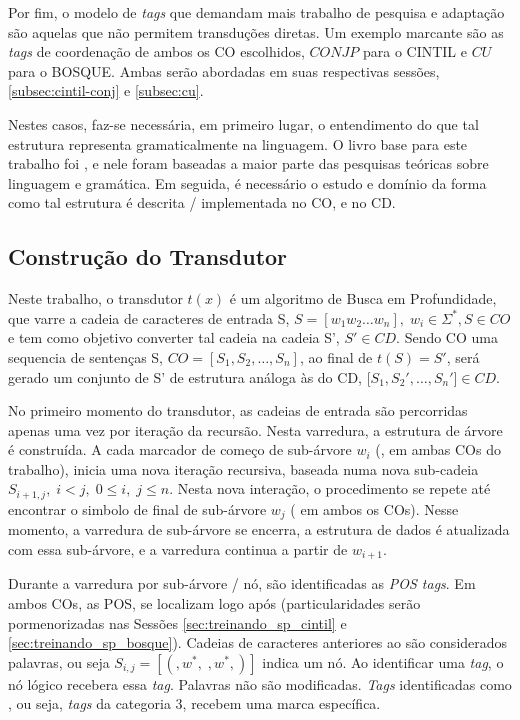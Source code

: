 Por fim, o modelo de \textit{tags} que demandam mais trabalho de pesquisa e adaptação são aquelas que não permitem transduções diretas. Um exemplo marcante são as \textit{tags} de coordenação de ambos os CO escolhidos, $CONJP$ para o CINTIL e $CU$ para o BOSQUE. Ambas serão abordadas em suas respectivas sessões, \ref{subsec:cintil-conj} e \ref{subsec:cu}.

Nestes casos, faz-se necessária, em primeiro lugar, o entendimento do que tal estrutura representa gramaticalmente na linguagem. O livro base para este trabalho foi \cite{Castilho2010gramatica}, e nele foram baseadas a maior parte das pesquisas teóricas sobre linguagem e gramática. Em seguida, é necessário o estudo e domínio da forma como tal estrutura é descrita / implementada no CO, e no CD.

\subsection{Construção do Transdutor}
\label{subsec:construcao_transdutor}
Neste trabalho, o transdutor $t(x)$ é um algoritmo de Busca em Profundidade, que varre a cadeia de caracteres de entrada S, $S = [w_1w_2\ldots w_n],\; w_i \in \Sigma^*,S \in CO$ e tem como objetivo converter tal cadeia na cadeia S', $S'\in CD$. Sendo CO uma sequencia de sentenças S, $CO=[S_1,S_2,\ldots,S_n]$, ao final de $t(S)=S'$, será gerado um conjunto de S' de estrutura análoga às do CD, [$S_1,S_2',\ldots,S_n']\in CD$. 

No primeiro momento do transdutor, as cadeias de entrada são percorridas apenas uma vez por iteração da recursão. Nesta varredura, a estrutura de árvore é construída. A cada marcador de começo de sub-árvore $w_i$ (, em ambas COs do trabalho), inicia uma nova iteração recursiva, baseada numa nova sub-cadeia $S_{i+1,j},\;i<j,\;0\leq i,\; j\leq n$. Nesta nova interação, o procedimento se repete até encontrar o simbolo de final de sub-árvore $w_j$ ( em ambos os COs). Nesse momento, a varredura de sub-árvore se encerra, a estrutura de dados é atualizada com essa sub-árvore, e a varredura continua a partir de $w_{i+1}$.

Durante a varredura por sub-árvore / nó, são identificadas as \textit{POS tags}. Em ambos COs, as POS, se localizam logo após \textquote{(} (particularidades serão pormenorizadas nas Sessões \ref{sec:treinando_sp_cintil} e \ref{sec:treinando_sp_bosque}). Cadeias de caracteres anteriores ao \textquote{)} são considerados palavras, ou seja $S_{i,j}=[(, w^*,\;,w^*,)]$ indica um nó. Ao identificar uma \textit{tag}, o nó lógico recebera essa \textit{tag}. Palavras não são modificadas. \textit{Tags} identificadas como , ou seja, \textit{tags} da categoria 3, recebem uma marca específica.

